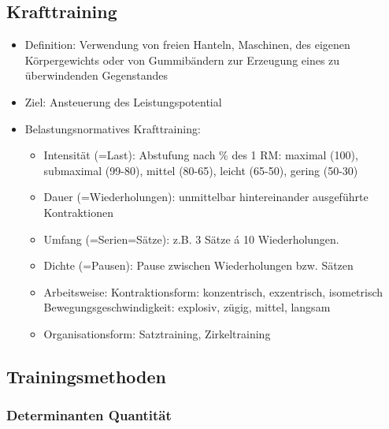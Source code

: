\subsection{Krafttraining}

\begin{itemize}
    \item Definition: Verwendung von freien Hanteln, Maschinen, des eigenen Körpergewichts oder von Gummibändern zur Erzeugung eines zu überwindenden Gegenstandes
    \item Ziel: Ansteuerung des Leistungspotential
    \item Belastungsnormatives Krafttraining:
    \begin{itemize}
        \item Intensität (=Last): Abstufung nach \% des 1 RM: maximal (100), submaximal (99-80), mittel (80-65), leicht (65-50), gering (50-30)
        \item Dauer (=Wiederholungen): unmittelbar hintereinander ausgeführte Kontraktionen
        \item Umfang (=Serien=Sätze): z.B. 3 Sätze á 10 Wiederholungen.
        \item Dichte (=Pausen): Pause zwischen Wiederholungen bzw. Sätzen
        \item Arbeitsweise: Kontraktionsform: konzentrisch, exzentrisch, isometrisch Bewegungsgeschwindigkeit: explosiv, zügig, mittel, langsam
        \item Organisationsform: Satztraining, Zirkeltraining
    \end{itemize}
\end{itemize}

\subsection{Trainingsmethoden}

\subsubsection*{Determinanten Quantität}

